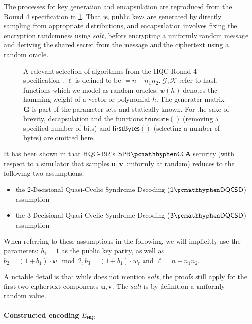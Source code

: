 The processes for key generation and encapsulation are reproduced from the Round 4 specification \cite{NISTPQC-R4:HQC22} in \cref{fig:hqc-spec}. That is, public keys are generated by directly sampling from appropriate distributions, and encapsulation involves fixing the encryption randomness using $\mathit{salt}$, before encrypting a uniformly random message and deriving the shared secret from the message and the ciphertext using a random oracle.

\begin{figure}
    
    \caption[
        A selection of algorithms from the HQC Round 4 specification.
    ]{
        A relevant selection of algorithms from the HQC Round 4 specification \cite{NISTPQC-R4:HQC22}. $\ell$ is defined to be $=n-n_1n_2$. $\mathcal G, \mathcal K$ refer to hash functions which we model as random oracles. $w(h)$ denotes the hamming weight of a vector or polynomial $h$. The generator matrix $\mathbf G$ is part of the parameter sets and statically known.
        For the sake of brevity, decapsulation and the functions $\mathsf{truncate}()$ (removing a specified number of bits) and $\mathsf{firstBytes}()$ (selecting a number of bytes) are omitted here.}
    \label{fig:hqc-spec}
\end{figure}

It has been shown in \cite[Lemma~P.2, Theorem~P.1]{EC:Xagawa22} that HQC-192's $\sprcca$ security (with respect to a simulator that samples $\mathbf u,\mathbf v$ uniformly at random) reduces to the following two assumptions:
\begin{itemize}
    \item the 2-Decisional Quasi-Cyclic Syndrome Decoding ($\twodqcsd$) assumption \cite[Definition~2.1.15]{NISTPQC-R4:HQC22}
    \item the 3-Decisional Quasi-Cyclic Syndrome Decoding ($\threedqcsd$) assumption \cite[Definition~2.1.17]{NISTPQC-R4:HQC22}
\end{itemize}
When referring to these assumptions in the following, we will implicitly use the parameters: $b_1 = 1$ as the public key parity, as well as $b_2 = (1 + b_1) \cdot w \mod 2, b_3 = (1+b_1) \cdot w_r$ and $\ell = n - n_1n_2$.

A notable detail is that while \cite{EC:Xagawa22} does not mention $\mathit{salt}$, the proofs still apply for the first two ciphertext components $\mathbf u, \mathbf v$. The $\mathit{salt}$ is by definition a uniformly random value.

\paragraph{Constructed encoding $E_\mathsf{HQC}$}

